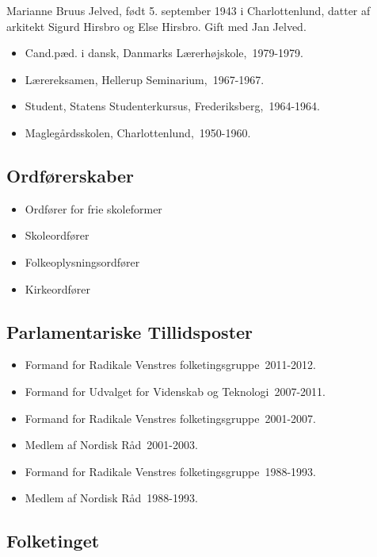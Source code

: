 \documentclass[11pt, a4paper]{awesome-cv}
\begin{document}
\makecvheader[R]
\makelettertitle
\begin{cvletter}
Marianne Bruus Jelved, født 5. september 1943 i Charlottenlund, datter af arkitekt Sigurd Hirsbro og Else Hirsbro. Gift med Jan Jelved. 

\begin{itemize}
\item Cand.pæd. i dansk, Danmarks Lærerhøjskole, 1979-1979.
\item Lærereksamen, Hellerup Seminarium, 1967-1967.
\item Student, Statens Studenterkursus, Frederiksberg, 1964-1964.
\item Maglegårdsskolen, Charlottenlund, 1950-1960.
\end{itemize}
\subsection*{Ordførerskaber}
\begin{itemize}
\item Ordfører for frie skoleformer
\item Skoleordfører
\item Folkeoplysningsordfører
\item Kirkeordfører
\end{itemize}
\subsection*{Parlamentariske Tillidsposter}
\begin{itemize}
\item Formand for Radikale Venstres folketingsgruppe 2011-2012.
\item Formand for Udvalget for Videnskab og Teknologi 2007-2011.
\item Formand for Radikale Venstres folketingsgruppe 2001-2007.
\item Medlem af Nordisk Råd 2001-2003.
\item Formand for Radikale Venstres folketingsgruppe 1988-1993.
\item Medlem af Nordisk Råd 1988-1993.
\end{itemize}
\subsection*{Folketinget}

\end{cvletter}
\end{document}
